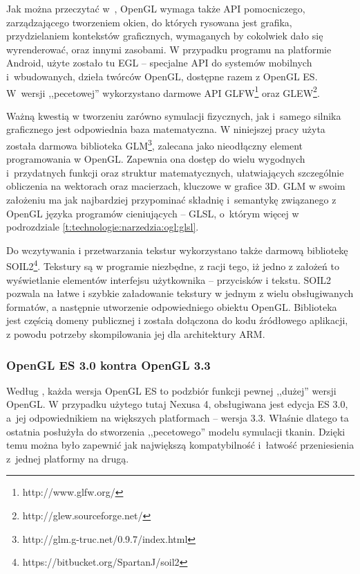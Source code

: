 		Jak można przeczytać w~\cite{oglspec}, OpenGL wymaga także API pomocniczego, zarządzającego tworzeniem okien, do których rysowana jest grafika, przydzielaniem kontekstów graficznych, wymaganych by cokolwiek dało się wyrenderować, oraz innymi zasobami. W przypadku programu na platformie Android, użyte zostało tu EGL -- specjalne API do systemów mobilnych i~wbudowanych, dzieła twórców OpenGL, dostępne razem z OpenGL ES. W~wersji ,,pecetowej'' wykorzystano darmowe API GLFW\footnote{http://www.glfw.org/} oraz GLEW\footnote{http://glew.sourceforge.net/}.
		
		Ważną kwestią w tworzeniu zarówno symulacji fizycznych, jak i~samego silnika graficznego jest odpowiednia baza matematyczna. W niniejszej pracy użyta została darmowa biblioteka GLM\footnote{http://glm.g-truc.net/0.9.7/index.html}, zalecana jako nieodłączny element programowania w OpenGL. Zapewnia ona dostęp do wielu wygodnych i~przydatnych funkcji oraz struktur matematycznych, ułatwiających szczególnie obliczenia na wektorach oraz macierzach, kluczowe w grafice 3D. GLM w swoim założeniu ma jak najbardziej przypominać składnię i~semantykę związanego z OpenGL języka programów cieniujących -- GLSL, o~którym więcej w podrozdziale \ref{t:technologie:narzedzia:ogl:glsl}.
		
		Do wczytywania i przetwarzania tekstur wykorzystano także darmową bibliotekę SOIL2\footnote{https://bitbucket.org/SpartanJ/soil2}. Tekstury są w programie niezbędne, z racji tego, iż jedno z założeń to wyświetlanie elementów interfejsu użytkownika -- przycisków i tekstu. SOIL2 pozwala na łatwe i szybkie załadowanie tekstury w jednym z wielu obsługiwanych formatów, a następnie utworzenie odpowiedniego obiektu OpenGL. Biblioteka jest częścią domeny publicznej i została dołączona do kodu źródłowego aplikacji, z powodu potrzeby skompilowania jej dla architektury ARM.
		
			\subsubsection{OpenGL ES 3.0 kontra OpenGL 3.3}
			\label{t:technologie:narzedzia:ogl:vs}
			
			Według \cite{oglspec}, każda wersja OpenGL ES to podzbiór funkcji pewnej ,,dużej'' wersji OpenGL. W przypadku użytego tutaj Nexusa 4, obsługiwana jest edycja ES 3.0, a~jej odpowiednikiem na większych platformach -- wersja 3.3. Właśnie dlatego ta ostatnia posłużyła do stworzenia ,,pecetowego'' modelu symulacji tkanin. Dzięki temu można było zapewnić jak największą kompatybilność i~łatwość przeniesienia z~jednej platformy na drugą.
			
